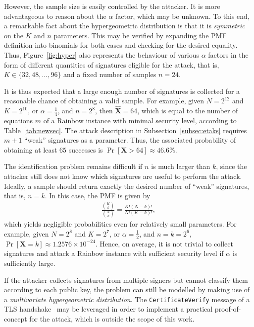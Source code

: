 \documentclass[12pt, a4paper, oneside]{memoir}
\theoremstyle{definition}
\begin{document}
However, the sample size is easily controlled by the attacker. It is more advantageous to reason about the $\alpha$ factor, which may be unknown. To this end, a remarkable fact about the hypergeometric distribution is that it is \emph{symmetric} on the $K$ and $n$ parameters. This may be verified by expanding the PMF definition into binomials for both cases and checking for the desired equality. Thus, Figure~\ref{fig:hyper} also represents the behaviour of various $\alpha$ factors in the form of different quantities of signatures eligible for the attack, that is, $K \in \{32, 48, \dots, 96\}$ and a fixed number of samples $n = 24$.

It is thus expected that a large enough number of signatures is collected for a reasonable chance of obtaining a valid sample. For example, given $N = 2^{12}$ and $K = 2^{10}$, or $\alpha = \frac{1}{4}$, and $n = 2^{8}$, then $\widehat{\mathbf{X}} = 64$, which is equal to the number of equations $m$ of a Rainbow instance with minimal security level, according to Table~\ref{tab:newsec}. The attack description in Subsection~\ref{subsec:etaks} requires $m + 1$ ``weak'' signatures as a parameter. Thus, the associated probability of obtaining at least $65$ successes is $\Pr[\mathbf{X} > 64] \approx 46.6\%$.

The identification problem remains difficult if $n$ is much larger than $k$, since the attacker still does not know which signatures are useful to perform the attack. Ideally, a sample should return exactly the desired number of ``weak'' signatures, that is, $n = k$. In this case, the PMF is given by
\begin{align}
  \frac{\binom{K}{k}}{\binom{N}{k}} = \frac{K! (N - k)!}{N! (K - k)!},
\end{align}
which yields negligible probabilities even for relatively small parameters. For example, given $N = 2^{8}$ and $K = 2^{7}$, or $\alpha = \frac{1}{2}$, and $n = k = 2^{6}$, $\Pr[\mathbf{X} = k] \approx 1.2576 \times 10^{-24}$. Hence, on average, it is not trivial to collect signatures and attack a Rainbow instance with sufficient security level if $\alpha$ is sufficiently large.

If the attacker collects signatures from multiple signers but cannot classify them according to each public key, the problem can still be modelled by making use of a \emph{multivariate hypergeometric distribution}. The \texttt{CertificateVerify} message of a TLS handshake~\cite[Sec.~4.4.3]{Rescorla:201808} may be leveraged in order to implement a practical proof-of-concept for the attack, which is outside the scope of this work.
\end{document}
